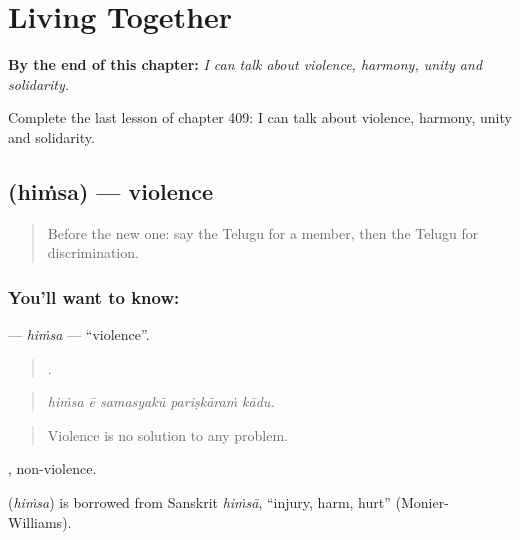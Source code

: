 
\chapter{Living Together}
\label{ch:te-living-together}

\begin{chapteropening}
\textbf{By the end of this chapter:} \emph{I can talk about violence, harmony, unity and solidarity.}

Complete the last lesson of chapter 409: I can talk about violence, harmony, unity and solidarity.
\end{chapteropening}

\section[\texorpdfstring{\te{హింస} (hiṁsa)}{హింస (hiṁsa)}]{ (hiṁsa) — violence}

\label{lesson:TE-C409-himsa}



\begin{quote}
Before the new one: say the Telugu for a member, then the Telugu for discrimination.
\end{quote}

\subsection*{You'll want to know: }
\textbf{} — \emph{hiṁsa} — \textquotedblleft{}violence\textquotedblright{}.

\begin{quote}
    .
\end{quote}

\begin{quote}
\emph{hiṁsa ē samasyakū pariṣkāraṁ kādu.}
\end{quote}

\begin{quote}
Violence is no solution to any problem.
\end{quote}

, non-violence.

\begin{cousinweb}
\textbf{} (\emph{hiṁsa}) is borrowed from Sanskrit \emph{hiṁsā}, \textquotedblleft{}injury, harm, hurt\textquotedblright{} (Monier-Williams).
\end{cousinweb}

